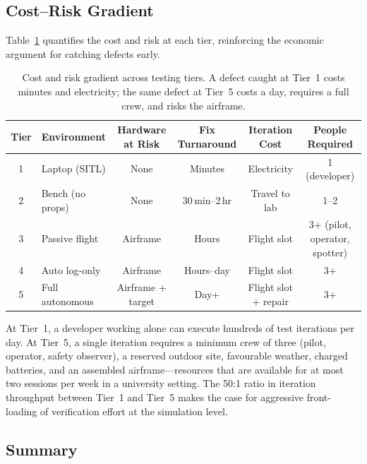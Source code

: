 \subsection{Cost--Risk Gradient}\label{sec:cost-risk}

Table~\ref{tab:cost-gradient} quantifies the cost and risk at each tier, reinforcing the economic argument for catching defects early.

\begin{table}[H]
\centering
\caption{Cost and risk gradient across testing tiers.  A defect caught at Tier~1 costs minutes and electricity; the same defect at Tier~5 costs a day, requires a full crew, and risks the airframe.}
\label{tab:cost-gradient}
\small
\begin{tabular}{@{}clcccc@{}}
\toprule
\textbf{Tier} & \textbf{Environment} & \textbf{Hardware at Risk} & \textbf{Fix Turnaround} & \textbf{Iteration Cost} & \textbf{People Required} \\
\midrule
1 & Laptop (SITL) & None & Minutes & Electricity & 1 (developer) \\
2 & Bench (no props) & None & 30\,min--2\,hr & Travel to lab & 1--2 \\
3 & Passive flight & Airframe & Hours & Flight slot & 3+ (pilot, operator, spotter) \\
4 & Auto log-only & Airframe & Hours--day & Flight slot & 3+ \\
5 & Full autonomous & Airframe + target & Day+ & Flight slot + repair & 3+ \\
\bottomrule
\end{tabular}
\end{table}

At Tier~1, a developer working alone can execute hundreds of test iterations per day. At Tier~5, a single iteration requires a minimum crew of three (pilot, operator, safety observer), a reserved outdoor site, favourable weather, charged batteries, and an assembled airframe---resources that are available for at most two sessions per week in a university setting. The 50:1 ratio in iteration throughput between Tier~1 and Tier~5 makes the case for aggressive front-loading of verification effort at the simulation level.

\subsection{Summary}

